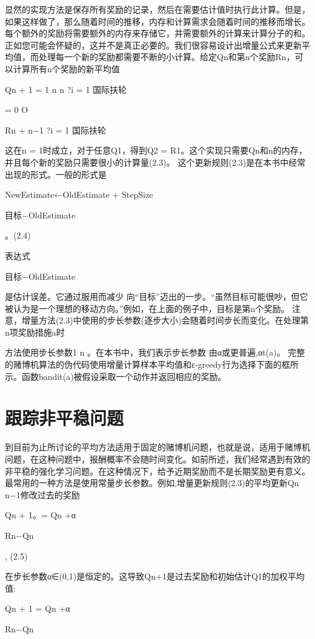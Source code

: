 显然的实现方法是保存所有奖励的记录，然后在需要估计值时执行此计算。但是，如果这样做了，那么随着时间的推移，内存和计算需求会随着时间的推移而增长。每个额外的奖励将需要额外的内存来存储它，并需要额外的计算来计算分子的和。
正如您可能会怀疑的，这并不是真正必要的。我们很容易设计出增量公式来更新平均值，而处理每一个新的奖励都需要不断的小计算。给定Qn和第n个奖励Rn，可以计算所有n个奖励的新平均值

Qn + 1 = 1
n
n ?i = 1
国际扶轮


=
0 O

Rn +
n−1 ?i = 1
国际扶轮


这在n = 1时成立，对于任意Q1，得到Q2 = R1。这个实现只需要Qn和n的内存，并且每个新的奖励只需要很小的计算量(2.3)。
这个更新规则(2.3)是在本书中经常出现的形式。一般的形式是

NewEstimate←OldEstimate + StepSize

目标−OldEstimate

。(2.4)

表达式

目标−OldEstimate

是估计误差。它通过服用而减少
向“目标”迈出的一步。“虽然目标可能很吵，但它被认为是一个理想的移动方向。”例如，在上面的例子中，目标是第n个奖励。
注意，增量方法(2.3)中使用的步长参数(逐步大小)会随着时间步长而变化。在处理第n项奖励措施a时

方法使用步长参数1
n
。在本书中，我们表示步长参数
由α或更普遍,αt(a)。
完整的赌博机算法的伪代码使用增量计算样本平均值和ε-greedy行为选择下面的框所示。函数bandit(a)被假设采取一个动作并返回相应的奖励。




\section{跟踪非平稳问题}

到目前为止所讨论的平均方法适用于固定的赌博机问题，也就是说，适用于赌博机问题，在这种问题中，报酬概率不会随时间变化。如前所述，我们经常遇到有效的非平稳的强化学习问题。在这种情况下，给予近期奖励而不是长期奖励更有意义。最常用的一种方法是使用常量步长参数。例如,增量更新规则(2.3)的平均更新Qn n−1修改过去的奖励

Qn + 1。= Qn +α

Rn−Qn

, 					(2.5)

在步长参数α∈(0,1)是恒定的。这导致Qn+1是过去奖励和初始估计Q1的加权平均值:

Qn + 1 = Qn +α

Rn−Qn

